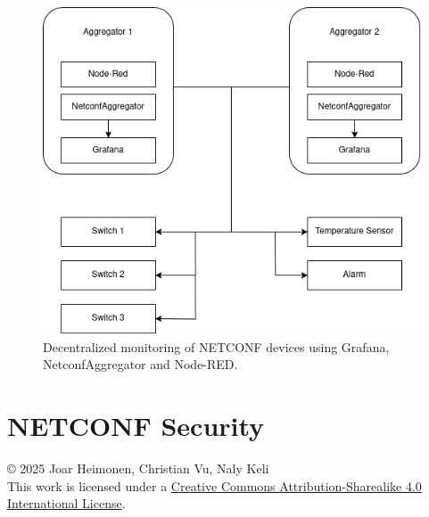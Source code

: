 \documentclass[12pt]{article}
\newcommand{\license}{
    \vspace{1em}
    \noindent\small{© 2025 Joar Heimonen,  Christian Vu, Naly Keli\\
    This work is licensed under a \href{https://creativecommons.org/licenses/by-sa/4.0/}{Creative Commons Attribution-Sharealike 4.0 International License}.}
}
\begin{document}
\newpage

\begin{figure}
  \centering
  \includegraphics[width=\textwidth]{architecture1.png}
  \caption{Decentralized monitoring of NETCONF devices using Grafana, NetconfAggregator and Node-RED.}
  \label{fig:decentralized-monitoring}
\end{figure}

\newpage

\section{NETCONF Security}

\pagebreak
{}
\printbibliography
\license
\end{document}
